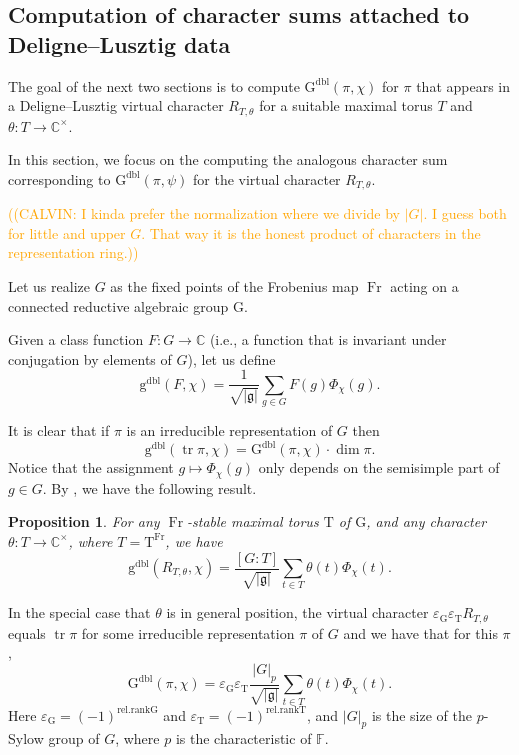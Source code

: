 \documentclass[12pt, reqno]{amsart}
\newtheorem{proposition}[theorem]{Proposition}
\theoremstyle{definition}
\theoremstyle{definition}
\theoremstyle{definition}
\newcommand{\cComplex}{\mathbb{C}}
\newcommand{\multiplicativegroup}[1]{#1^{\times}}
\newcommand{\sizeof}[1]{\left|#1\right|}
\newcommand{\fieldCharacter}{\psi}
\newcommand{\grpIndex}[2]{\left[#1:#2\right]}
\newcommand{\trace}{\operatorname{tr}}
\newcommand{\finiteField}{\mathbb{F}}
\newcommand{\Frobenius}{\operatorname{Fr}}
\newcommand{\dblGaussSumScalar}[2]{\mathrm{G}^{\mathrm{dbl}}\left(#1, #2\right)}
\newcommand{\dblVirtualGaussSumScalar}[2]{\mathrm{g}^{\mathrm{dbl}}\left(#1, #2\right)}
\newcommand{\lieAlgebra}{\mathfrak{g}}
\newcommand{\algebraicGroup}[1]{\boldsymbol{\mathrm{#1}}}
\newcommand{\calvin}[1]{\textcolor{orange}{\sffamily ((CALVIN: #1))}}
\begin{document}
\subsection{Computation of character sums attached to Deligne--Lusztig data}

The goal of the next two sections is to compute $\dblGaussSumScalar{\pi}{\chi}$ for $\pi$ that appears in a Deligne--Lusztig virtual character $R_{T,\theta}$ for a suitable maximal torus $T$ and $\theta \colon T \to \multiplicativegroup{\cComplex}$.

In this section, we focus on the computing the analogous character sum corresponding to $\dblGaussSumScalar{\pi}{\fieldCharacter}$ for the virtual character $R_{T,\theta}$.

\calvin{I kinda prefer the normalization where we divide by $|G|$. I guess both for little and upper $G$. That way it is the honest product of characters in the representation ring.}

Let us realize $G$ as the fixed points of the Frobenius map $\Frobenius$ acting on a connected reductive algebraic group $\algebraicGroup{G}$.

Given a class function $F \colon G \to \cComplex$ (i.e., a function that is invariant under conjugation by elements of $G$), let us define $$\dblVirtualGaussSumScalar{F}{\chi} = \frac{1}{\sqrt{\sizeof{\lieAlgebra}}} \sum_{g \in G} F\left(g\right) \Phi_{\chi}\left(g\right).$$

It is clear that if $\pi$ is an irreducible representation of $G$ then $$\dblVirtualGaussSumScalar{\trace \pi}{\chi} = \dblGaussSumScalar{\pi}{\chi} \cdot \dim \pi.$$
Notice that the assignment $g \mapsto \Phi_{\chi}\left(g\right)$ only depends on the semisimple part of $g \in G$. By \cite[Theorem in Section 1.2]{SaitoShinoda2000}, we have the following result.
\begin{proposition}\label{prop:reduction-of-gauss-sum-to-torus}
	For any $\Frobenius$-stable maximal torus $\algebraicGroup{T}$ of $\algebraicGroup{G}$, and any character $\theta \colon T \to \multiplicativegroup{\cComplex}$, where $T = \algebraicGroup{T}^{\Frobenius}$, we have
	$$ \dblVirtualGaussSumScalar{R_{T, \theta}}{\chi} = \frac{\grpIndex{G}{T}}{\sqrt{\sizeof{\lieAlgebra}}} \sum_{t \in T} \theta\left(t\right) \Phi_{\chi}\left(t\right).$$
\end{proposition}
In the special case that $\theta$ is in general position, the virtual character $\varepsilon_{\algebraicGroup{G}} \varepsilon_{\algebraicGroup{T}} R_{T, \theta}$ equals $\trace \pi$ for some irreducible representation $\pi$ of $G$ and we have that for this $\pi$,
$$\dblGaussSumScalar{\pi}{\chi} = \varepsilon_{\algebraicGroup{G}} \varepsilon_{\algebraicGroup{T}} \frac{\sizeof{G}_p}{\sqrt{\sizeof{\lieAlgebra}}} \sum_{t \in T} \theta\left(t\right) \Phi_{\chi}\left(t\right).$$
Here $\varepsilon_{\algebraicGroup{G}} = \left(-1\right)^{\mathrm{rel.rank} \algebraicGroup{G}}$ and $\varepsilon_{\algebraicGroup{T}} = \left(-1\right)^{\mathrm{rel.rank} \algebraicGroup{T}}$, and $\sizeof{G}_p$ is the size of the $p$-Sylow group of $G$, where $p$ is the characteristic of $\finiteField$. 
\end{document}
